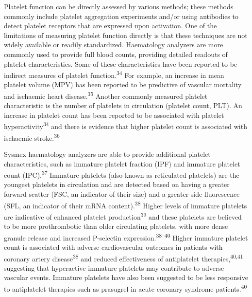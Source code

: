 \documentclass[11pt,twoside]{bristolthesis}
\begin{document}
Platelet function can be directly assessed by various methods; these methods commonly include platelet aggregation experiments and/or using antibodies to detect platelet receptors that are expressed upon activation. One of the limitations of measuring platelet function directly is that these techniques are not widely available or readily standardized. Haematology analyzers are more commonly used to provide full blood counts, providing detailed readouts of platelet characteristics. Some of these characteristics have been reported to be indirect measures of platelet function.\textsuperscript{34} For example, an increase in mean platelet volume (MPV) has been reported to be predictive of vascular mortality and ischaemic heart disease.\textsuperscript{35} Another commonly measured platelet characteristic is the number of platelets in circulation (platelet count, PLT). An increase in platelet count has been reported to be associated with platelet hyperactivity\textsuperscript{34} and there is evidence that higher platelet count is associated with ischaemic stroke.\textsuperscript{36}

Sysmex haematology analyzers are able to provide additional platelet characteristics, such as immature platelet fraction (IPF) and immature platelet count (IPC).\textsuperscript{37} Immature platelets (also known as reticulated platelets) are the youngest platelets in circulation and are detected based on having a greater forward scatter (FSC, an indicator of their size) and a greater side fluorescence (SFL, an indicator of their mRNA content).\textsuperscript{38} Higher levels of immature platelets are indicative of enhanced platelet production\textsuperscript{39} and these platelets are believed to be more prothrombotic than older circulating platelets, with more dense granule release and increased P-selectin expression.\textsuperscript{38--40} Higher immature platelet count is associated with adverse cardiovascular outcomes in patients with coronary artery disease\textsuperscript{38} and reduced effectiveness of antiplatelet therapies,\textsuperscript{40,41} suggesting that hyperactive immature platelets may contribute to adverse vascular events. Immature platelets have also been suggested to be less responsive to antiplatelet therapies such as prasugrel in acute coronary syndrome patients.\textsuperscript{40}
\end{document}

